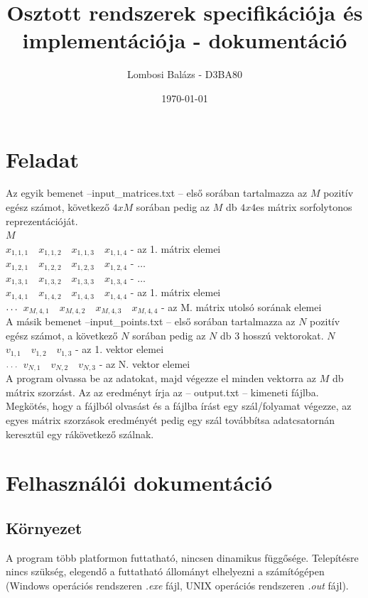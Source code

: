 \documentclass{article}
\title{Osztott rendszerek specifikációja és implementációja - dokumentáció}
\author{Lombosi Balázs - D3BA80}
\date{\today}
\begin{document}
\maketitle

\tableofcontents
\newpage

\section{Feladat}

Az egyik bemenet --input\_matrices.txt -- első sorában tartalmazza az $M$ pozitív egész számot, következő $4xM$ sorában pedig az $M$ db $4 x 4$es mátrix sorfolytonos reprezentációját.\\
$M$\\
$x_{1,1,1} \quad x_{1,1,2} \quad x_{1,1,3}\quad x_{1,1,4}$ - az 1. mátrix elemei\\
$x_{1,2,1} \quad x_{1,2,2} \quad x_{1,2,3}\quad x_{1,2,4}$ - $\dots$\\
$x_{1,3,1} \quad x_{1,3,2} \quad x_{1,3,3}\quad x_{1,3,4}$ - $\dots$\\
$x_{1,4,1} \quad x_{1,4,2} \quad x_{1,4,3}\quad x_{1,4,4}$ - az 1. mátrix elemei\\
$\dots\\ $
$x_{M,4,1} \quad x_{M,4,2} \quad x_{M,4,3}\quad x_{M,4,4}$ - az M. mátrix utolsó sorának elemei\\

A másik bemenet --input\_points.txt -- első sorában tartalmazza az $N$ pozitív egész számot, a következő $N$ sorában pedig az $N$ db $3$ hosszú vektorokat.
$N$\\
$v_{1,1} \quad v_{1,2} \quad v_{1,3}$ - az 1. vektor elemei\\
$\dots\\$
$v_{N,1} \quad v_{N,2} \quad v_{N,3}$ - az N. vektor elemei\\

A program olvassa be az adatokat, majd végezze el minden vektorra az $M$ db mátrix szorzást.
Az az eredményt írja az -- output.txt -- kimeneti fájlba.
Megkötés, hogy a fájlból olvasást és a fájlba írást egy szál/folyamat végezze, az egyes mátrix szorzások eredményét pedig egy szál továbbítsa adatcsatornán keresztül egy rákövetkező szálnak.
\newpage

\section{Felhasználói dokumentáció}

\subsection{Környezet}
A program több platformon futtatható, nincsen dinamikus függősége. Telepítésre nincs szükség, elegendő a futtatható állományt elhelyezni a számítógépen \\
(Windows operációs rendszeren \textit{.exe} fájl, UNIX operációs rendszeren \textit{.out} fájl).
\end{document}
